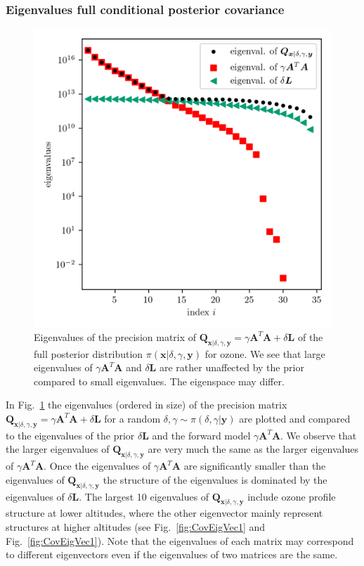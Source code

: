 \subsubsection{Eigenvalues full conditional posterior covariance}
\begin{figure}[ht!]
	\centering
	\includegraphics{CovSing.png}
	\caption[Eigenvalues of the posterior precision matrix]{Eigenvalues of the precision matrix of $\bm{Q}_{ \bm{x}|\delta, \gamma, \bm{y}}= \gamma \bm{A}^T \bm{A} + \delta \bm{L}$ of the full posterior distribution $\pi(\bm{x}|\delta, \gamma, \bm{y})$ for ozone.
		We see that large eigenvalues of $\gamma \bm{A}^T \bm{A}$ and $ \delta \bm{L}$ are rather unaffected by the prior compared to small eigenvalues.
		The eigenspace may differ.}
	\label{fig:PostCov}
\end{figure}
In Fig.~\ref{fig:PostCov} the eigenvalues (ordered in size) of the precision matrix $\bm{Q}_{ \bm{x}|\delta, \gamma,\bm{y}}=  \gamma \bm{A}^T \bm{A} + \delta \bm{L} $ for a random $\delta,\gamma \sim \pi(\delta,\gamma|\bm{y})$ are plotted and compared to the eigenvalues of the prior $\delta \bm{L}$ and the forward model $\gamma \bm{A}^T \bm{A}$.
We observe that the larger eigenvalues of $\bm{Q}_{ \bm{x}|\delta, \gamma,\bm{y}}$ are very much the same as the larger eigenvalues of $\gamma \bm{A}^T \bm{A}$.
Once the eigenvalues of $\gamma \bm{A}^T \bm{A}$ are significantly smaller than the eigenvalues of $\bm{Q}_{ \bm{x}|\delta, \gamma,\bm{y}}$ the structure of the eigenvalues is dominated by the eigenvalues of $\delta \bm{L}$.
The largest 10 eigenvalues of $\bm{Q}_{ \bm{x}|\delta, \gamma,\bm{y}}$ include ozone profile structure at lower altitudes, where the other eigenvector mainly represent structures at higher altitudes (see Fig.~\ref{fig:CovEigVec1} and Fig.~\ref{fig:CovEigVec1}).
Note that the eigenvalues of each matrix may correspond to different eigenvectors even if the eigenvalues of two matrices are the same.

